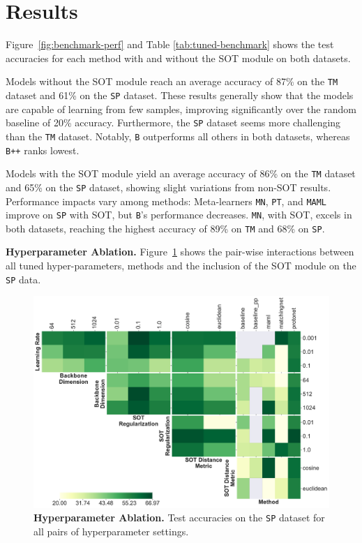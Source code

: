 \section{Results}


Figure~\ref{fig:benchmark-perf} and Table \ref{tab:tuned-benchmark} shows the test accuracies for each method with and without the SOT module on both datasets. 

Models without the SOT module reach an average accuracy of 87\% on the \texttt{TM} dataset and 61\% on the \texttt{SP} dataset. These results generally show that the models are capable of learning from few samples, improving significantly over the random baseline of 20\% accuracy. Furthermore, the \texttt{SP} dataset seems more challenging than the \texttt{TM} dataset. Notably, \texttt{B} outperforms all others in both datasets, whereas \texttt{B++} ranks lowest.

Models with the SOT module yield an average accuracy of 86\% on the \texttt{TM} dataset and 65\% on the \texttt{SP} dataset, showing slight variations from non-SOT results. Performance impacts vary among methods: Meta-learners \texttt{MN}, \texttt{PT}, and \texttt{MAML} improve on \texttt{SP} with SOT, but \texttt{B}'s performance decreases. \texttt{MN}, with SOT, excels in both datasets, reaching the highest accuracy of 89\% on \texttt{TM} and 68\% on \texttt{SP}.

\textbf{Hyperparameter Ablation.} Figure~\ref{fig:hparams-swissprot-grid} shows the pair-wise interactions between all tuned hyper-parameters, methods and the inclusion of the SOT module on the \texttt{SP} data. 


\begin{figure}[h!]
    \centering
    \includegraphics[width=1\columnwidth]{figures/hparams-swissprot-grid.pdf}
    \caption{\textbf{Hyperparameter Ablation.} Test accuracies on the \texttt{SP} dataset for all pairs of hyperparameter settings.}
    \label{fig:hparams-swissprot-grid}
\end{figure}

